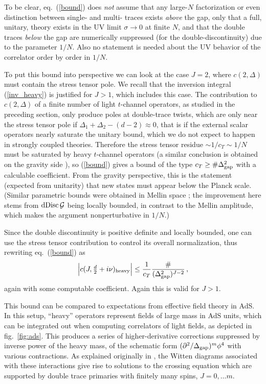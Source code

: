 \documentclass[11pt, reqno,preprint]{article}
\def\be{\begin{equation}}
\def\ee{\end{equation}}
\def\dDisc{{\rm dDisc}\,}
\def\j{J}
\def\GG{\mathcal{G}}
\begin{document}
To be clear, eq.~(\ref{bound}) does \emph{not} assume that any large-$N$ factorization or
even distinction between single- and multi- traces exists \emph{above} the gap, only that a full, unitary, theory exists
in the UV limit $\sigma\to 0$ at finite $N$, and that the double traces \emph{below} the gap are numerically suppressed (for the double-discontinuity)
due to the parameter $1/N$.  Also no statement is needed about the UV behavior of the correlator order by order in $1/N$.

To put this bound into perspective we can look at the case $\j=2$, where $c(2,\Delta)$
must contain the stress tensor pole.  We recall that the inversion integral (\ref{inv_heavy}) is justified for $\j>1$,
which includes this case.
The contribution to $c(2,\Delta)$ of a finite number of light $t$-channel operators,
as studied in the preceding section, only produce poles at double-trace twists, which are only near the stress tensor pole
if $\Delta_1+\Delta_2-(d-2)\approx 0$, that is if the external scalar operators nearly saturate the unitary bound, which
we do not expect to happen in strongly coupled theories.  Therefore the stress tensor residue ${\sim} 1/c_T\sim 1/N$
must be saturated by heavy $t$-channel operators (a similar conclusion is obtained
on the gravity side \cite{Polchinski:2002jw}), so (\ref{bound}) gives a bound of the type
$c_T\geq \#\Delta_{\rm gap}^2$ with a calculable coefficient.
From the gravity perspective, this is the statement (expected from unitarity) that new states must appear below the Planck scale.
(Similar parametric bounds were obtained in Mellin space \cite{Alday:2016htq}; the improvement here
stems from $\dDisc\GG$ being locally bounded, in contrast to the Mellin amplitude, which makes the argument nonperturbative in $1/N$.)


Since the double discontinuity is positive definite and locally bounded,
one can use the stress tensor contribution to control its overall normalization,
thus rewriting eq.~(\ref{bound}) as
\be
 \Big|c(\j,\tfrac{d}{2}+i\nu)_{\rm heavy}\Big| \leq \frac{1}{c_T}\frac{\#}{(\Delta_{\rm gap}^2)^{\j-2}}\,, \label{bound1}
\ee
again with some computable coefficient.  Again this is valid for $\j>1$.


This bound can be compared to expectations from effective field theory in AdS.
In this setup, ``heavy'' operators represent fields of large mass in AdS units, which can be integrated
out when computing correlators of light fields, as depicted in fig.~\ref{fig:ads}.
This produces a series of higher-derivative corrections suppressed by inverse power of the heavy mass,
of the schematic form $(\partial^2/\Delta_{\rm gap})^m \phi^4$ with various contractions.
As explained originally in \cite{Heemskerk:2009pn}, the Witten diagrams associated with these
interactions give rise to solutions to the crossing equation which are supported by double trace primaries with
finitely many spins, $\j=0,\ldots m$. 
\end{document}
